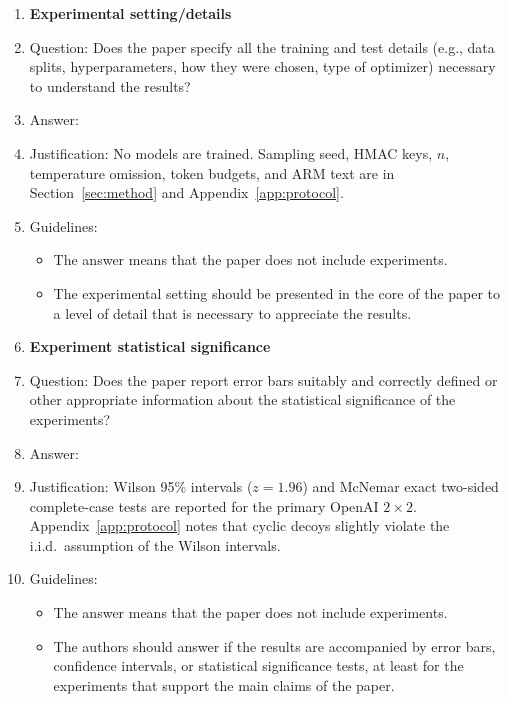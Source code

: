 \begin{enumerate}
\item {\bf Experimental setting/details}
\item[] Question: Does the paper specify all the training and test details (e.g., data splits, hyperparameters, how they were chosen, type of optimizer) necessary to understand the results?
\item[] Answer: \answerYes{}
\item[] Justification: No models are trained. Sampling seed, HMAC keys, $n$, temperature omission, token budgets, and ARM text are in Section~\ref{sec:method} and Appendix~\ref{app:protocol}.
\item[] Guidelines:
\begin{itemize}
\item The answer \answerNA{} means that the paper does not include experiments.
\item The experimental setting should be presented in the core of the paper to a level of detail that is necessary to appreciate the results.
\end{itemize}

\item {\bf Experiment statistical significance}
\item[] Question: Does the paper report error bars suitably and correctly defined or other appropriate information about the statistical significance of the experiments?
\item[] Answer: \answerYes{}
\item[] Justification: Wilson 95\% intervals ($z{=}1.96$) and McNemar exact two-sided complete-case tests are reported for the primary OpenAI $2{\times}2$. Appendix~\ref{app:protocol} notes that cyclic decoys slightly violate the i.i.d.\ assumption of the Wilson intervals.
\item[] Guidelines:
\begin{itemize}
\item The answer \answerNA{} means that the paper does not include experiments.
\item The authors should answer \answerYes{} if the results are accompanied by error bars, confidence intervals, or statistical significance tests, at least for the experiments that support the main claims of the paper.
\end{itemize}


\end{enumerate}
